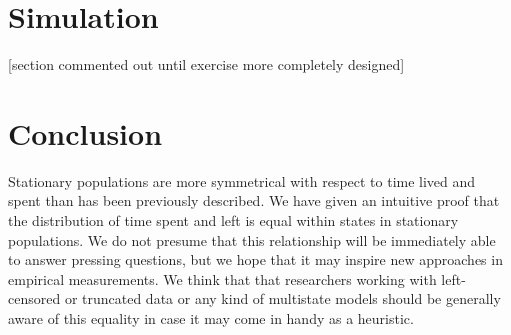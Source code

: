 \documentclass[12pt,oneside,a4paper]{article}
\theoremstyle{definition}
\begin{document}
\section{Simulation}
[section commented out until exercise more completely designed]
% 
% 
% 


\section{Conclusion}
Stationary populations are more symmetrical with respect to time lived and
spent than has been previously described. We have given an intuitive proof that
the distribution of time spent and left is equal within states in
stationary populations. We do not presume that this relationship will be immediately able to answer pressing questions, but we
hope that it may inspire new approaches in empirical measurements. We think
that that researchers working with left-censored or truncated data or
any kind of multistate models should be generally aware of this equality in case
it may come in handy as a heuristic.
\end{document}
